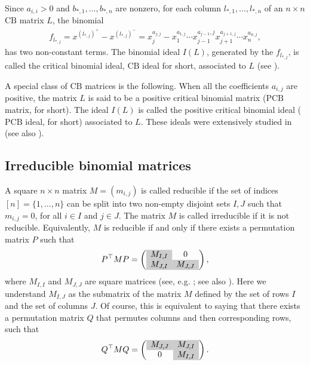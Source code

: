 \documentclass[10pt]{amsart}
\newcommand{\eg}{e.g.}
\newcommand{\y}{\cellcolor{gray!40}}
\newcommand{\pcb}{\mbox{$\mathrm{PCB}$}}
\newcommand{\cb}{\mbox{$\mathrm{CB}$}}
\theoremstyle{definition}
\theoremstyle{remark}
\begin{document}
Since $a_{i,i}>0$ and $b_{*,1},\ldots ,b_{*,n}$ are nonzero, for each
column $l_{*,1},\ldots ,l_{*,n}$ of an $n\times n$ $\cb$ matrix $L$,
the binomial
\begin{eqnarray*}
f_{l_{*,j}}=x^{(l_{*,j})^+}-x^{(l_{*,j})^-}=x_j^{a_{j,j}}-x_1^{a_{1,j}}\cdots
x_{j-1}^{a_{j-1},j}x_{j+1}^{a_{j+1,j}}\cdots x_n^{a_{n,j}},
\end{eqnarray*}
has two non-constant terms. The binomial ideal $I(L)$, generated by
the $f_{l_{*,j}}$, is called the critical binomial ideal, $\cb$ ideal
for short, associated to $L$ (see \cite{opv}).

A special class of $\cb$ matrices is the following. When all the
coefficients $a_{i,j}$ are positive, the matrix $L$ is said to be a
positive critical binomial matrix ($\pcb$ matrix, for short). The
ideal $I(L)$ is called the positive critical binomial ideal ($\pcb$
ideal, for short) associated to $L$. These ideals were extensively
studied in \cite{op} (see also \cite{opv}).

\subsection{Irreducible binomial matrices}\label{ibm}

 A square $n\times n$ matrix $M=(m_{i,j})$ is called
reducible if the set of indices $[n]=\{1,\ldots ,n\}$ can be split
into two non-empty disjoint sets $I,J$ such that $m_{i,j}=0$, for all
$i\in I$ and $j\in J$. The matrix $M$ is called irreducible if it is
not reducible. Equivalently, $M$ is reducible if and only if there
exists a permutation matrix $P$ such that
\begin{eqnarray}\label{reducedform}
P^{\top}MP=\left(\begin{array}{cc}\cellcolor{gray!40} M_{I,I}&0\\
\cellcolor{gray!40} M_{J,I}&\cellcolor{gray!40} M_{J,J}\end{array}\right),
\end{eqnarray}
where $M_{I,I}$ and $M_{J,J}$ are square matrices (see, \eg
\cite[Chapter~XIII, p.50]{gantmacher}; see also \cite[\S~3.2]{br}).
Here we understand $M_{I,J}$ as the submatrix of the matrix $M$
defined by the set of rows $I$ and the set of columns $J$.  Of course,
this is equivalent to saying that there exists a permutation matrix
$Q$ that permutes columns and then corresponding rows, such that
\begin{eqnarray*}
Q^{\top}MQ=\left(\begin{array}{cc}
\y M_{J,J}&\y M_{J,I}\\0&\y M_{I,I}\end{array}\right).
\end{eqnarray*}
\end{document}
